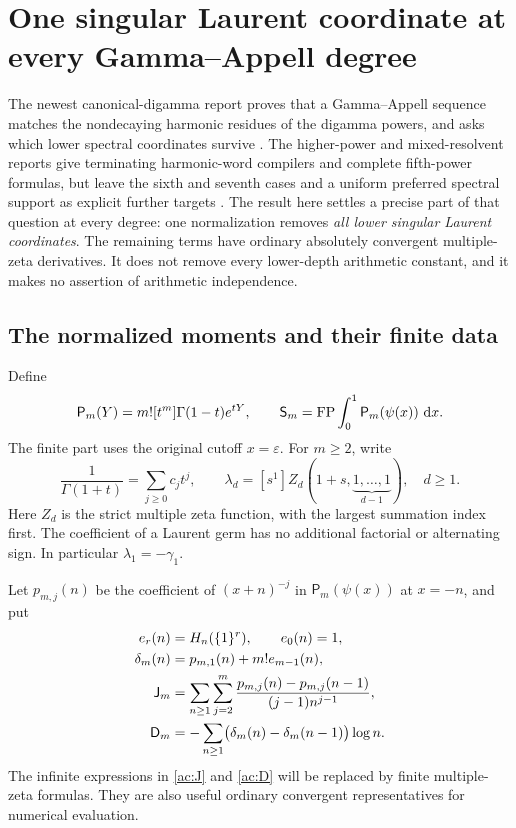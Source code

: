 \section{One singular Laurent coordinate at every Gamma--Appell degree}
\label{ac:section}

The newest canonical-digamma report proves that a Gamma--Appell sequence
matches the nondecaying harmonic residues of the digamma powers, and
asks which lower spectral coordinates survive
\cite{Fifth}. The higher-power and mixed-resolvent reports give
terminating harmonic-word compilers and complete fifth-power formulas,
but leave the sixth and seventh cases and a uniform preferred spectral
support as explicit further targets \cite{Higher,Mixed}.
The result here settles a precise part of that question at every degree:
one normalization removes \emph{all lower singular Laurent coordinates}.
The remaining terms have ordinary absolutely convergent multiple-zeta
derivatives. It does not remove every lower-depth arithmetic constant,
and it makes no assertion of arithmetic independence.

\subsection{The normalized moments and their finite data}

Define
\begin{equation}\label{ac:appell}
 \mathsf P_m(Y)=m![t^m]\Gamma(1-t)e^{tY},\qquad
 \mathsf S_m=\operatorname{FP}\int_0^1\mathsf P_m(\psi(x))\,\,\mathrm d x.
\end{equation}
The finite part uses the original cutoff $x=\varepsilon$.
For $m\ge2$, write
\begin{equation}\label{ac:coordinates}
 \frac1{\Gamma(1+t)}=\sum_{j\ge0}c_jt^j,
 \qquad
 \lambda_d=[s^1]Z_d(1+s,\underbrace{1,\ldots,1}_{d-1}),
 \quad d\ge1.
\end{equation}
Here $Z_d$ is the strict multiple zeta function, with the largest
summation index first. The coefficient of a Laurent germ has no
additional factorial or alternating sign. In particular
$\lambda_1=-\gamma_1$.

Let $p_{m,j}(n)$ be the coefficient of $(x+n)^{-j}$ in
$\mathsf P_m(\psi(x))$ at $x=-n$, and put
\begin{align}
 e_r(n)&=H_n(\{1\}^r),\qquad e_0(n)=1,\notag\\
 \delta_m(n)&=p_{m,1}(n)+m!e_{m-1}(n),\label{ac:defect}\\
 \mathsf J_m&=\sum_{n\ge1}\sum_{j=2}^m
       \frac{p_{m,j}(n)-p_{m,j}(n-1)}{(j-1)n^{j-1}},
       \label{ac:J}\\
 \mathsf D_m&=-\sum_{n\ge1}
                \bigl(\delta_m(n)-\delta_m(n-1)\bigr)\log n.
       \label{ac:D}
\end{align}
The infinite expressions in \eqref{ac:J} and \eqref{ac:D} will be
replaced by finite multiple-zeta formulas. They are also useful
ordinary convergent representatives for numerical evaluation.

